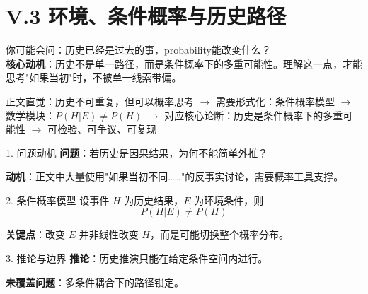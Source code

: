 \documentclass[../main.tex]{subfiles}
\begin{document}
\chapter{V.3 环境、条件概率与历史路径}
\label{math:history}

\begin{motivation}
	你可能会问：历史已经是过去的事，probability能改变什么？\\
	\textbf{核心动机}：历史不是单一路径，而是条件概率下的多重可能性。理解这一点，才能思考"如果当初"时，不被单一线索带偏。
\end{motivation}

\begin{logicmap}
	正文直觉：历史不可重复，但可以概率思考
	$\rightarrow$ 需要形式化：条件概率模型
	$\rightarrow$ 数学模块：$P(H|E) \neq P(H)$
	$\rightarrow$ 对应核心论断：历史是条件概率下的多重可能性
	$\rightarrow$ 可检验、可争议、可复现
\end{logicmap}


\begin{mathbox}{1. 问题动机}
	\textbf{问题}：若历史是因果结果，为何不能简单外推？
	
	\textbf{动机}：正文中大量使用"如果当初不同……"的反事实讨论，需要概率工具支撑。
\end{mathbox}

\begin{mathbox}{2. 条件概率模型}
	设事件 $H$ 为历史结果，$E$ 为环境条件，则
	\[ P(H|E) \neq P(H) \]
	
	\textbf{关键点}：改变 $E$ 并非线性改变 $H$，而是可能切换整个概率分布。
\end{mathbox}

\begin{mathbox}{3. 推论与边界}
	\textbf{推论}：历史推演只能在给定条件空间内进行。
	
	\textbf{未覆盖问题}：多条件耦合下的路径锁定。
\end{mathbox}
\end{document}
